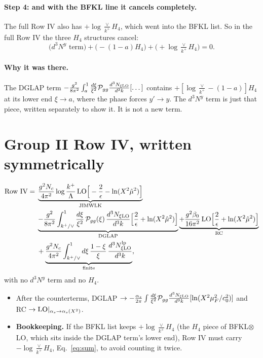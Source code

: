 \documentclass[10pt]{article}
\numberwithin{equation}{section}
\newcommand{\LO}{{\rm LO}}
\begin{document}
\paragraph{Step 4: and with the BFKL line it cancels completely.} The full Row IV also has $+\log\frac{\vee}{k^+}H_4$, which went into the BFKL list. So in the full Row IV the three $H_4$ structures cancel:
\begin{equation}
\Big(d^3N^y\text{ term}\Big)+\Big(-(1-a)H_4\Big)+\Big(+\log\tfrac{\vee}{k^+}H_4\Big)=0 .
\end{equation}
\paragraph{Why it was there.} The DGLAP term $-\frac{g^2}{8\pi^2}\int_a^1\frac{d\xi}{\xi^2}\mathcal P_{gg}\frac{d^3N_{\xi\rm LO}}{d^3k}[\dots]$ contains $+[\log\frac{\vee}{k^+}-(1-a)]H_4$ at its lower end $\xi\to a$, where the phase forces $y'\to y$. The $d^3N^y$ term is just that piece, written separately to show it. It is not a new term.

\section{Group II Row IV, written symmetrically}
\begin{align}
\text{Row IV}={}&\underbrace{\frac{g^2N_c}{4\pi^2}\log\frac{k^+}{\Lambda}\,\LO\Big[-\frac2\epsilon-\ln(X^2\hat\mu^2)\Big]}_{\rm JIMWLK}
\notag\\&\underbrace{-\frac{g^{2}}{8\pi^{2}}\int_{k^+/\vee}^{1}\frac{d\xi}{\xi^{2}}\,\mathcal P_{gg}(\xi)\,\frac{d^{3}N_{\xi\rm LO}}{d^{3}k}\Big[\frac{2}{\epsilon}+\ln(X^2\hat\mu^2)\Big]}_{\rm DGLAP}
\underbrace{+\frac{g^{2}\beta_{0}}{16\pi^{2}}\,\LO\Big[\frac{2}{\epsilon}+\ln(X^2\hat\mu^2)\Big]}_{\rm RC}\notag\\
&+\underbrace{\frac{g^{2}N_c}{4\pi^{2}}\int_{k^+/\vee}^{1}d\xi\,\frac{1-\xi}{\xi}\,\frac{d^{3}N^{\rm lp}_{\xi\rm LO}}{d^{3}k}}_{\rm finite},
\end{align}
with no $d^3N^y$ term and no $H_4$.
\begin{itemize}
\item After the counterterms, DGLAP $\to-\frac{\alpha_s}{2\pi}\int\frac{d\xi}{\xi^2}\mathcal P_{gg}\frac{d^3N_{\xi\rm LO}}{d^3k}[\ln(X^2\mu_F^2/c_0^2)]$ and RC $\to\LO|_{\alpha_s\to\alpha_s(X^2)}$.
\item \textbf{Bookkeeping.} If the BFKL list keeps $+\log\frac{\vee}{k^+}H_4$ (the $H_4$ piece of BFKL$\otimes$LO, which sits inside the DGLAP term's lower end), Row IV must carry $-\log\frac{\vee}{k^+}H_4$, Eq.~\eqref{eq:sum}, to avoid counting it twice.
\end{itemize}
\end{document}

